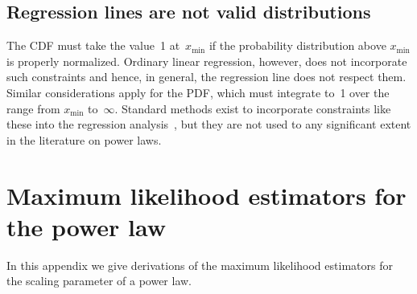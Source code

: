 \documentclass[final]{siamltex}
\newcommand{\xmin}{\ensuremath{x_{\min}}}
\begin{document}
\begin{appendix}
\subsection{Regression lines are not valid distributions}
The CDF must take the value~1 at~$\xmin$ if the probability distribution
above $\xmin$ is properly normalized.  Ordinary linear regression, however,
does not incorporate such constraints and hence, in general, the regression
line does not respect them.  Similar considerations apply for the PDF,
which must integrate to~1 over the range from $\xmin$ to~$\infty$.
Standard methods exist to incorporate constraints like these into the
regression analysis~\cite{Weisberg-regression}, but they are not used to
any significant extent in the literature on power laws.


\section{Maximum likelihood estimators for the power law}
\label{appendix:pl_mle}
In this appendix we give derivations of the maximum likelihood estimators
for the scaling parameter of a power law.



\end{appendix}
\end{document}
